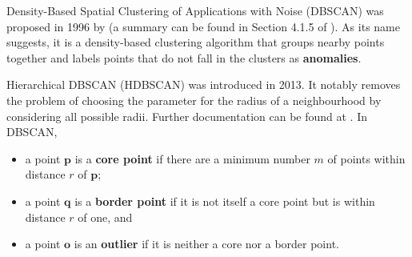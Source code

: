 \documentclass[20pt,landscape,footrule,headrule]{foils}
\newcommand{\newl}{\newline\newline}
\def\fh{\foilhead}
\begin{document}
\fh{DBSCAN}
Density-Based Spatial Clustering of Applications with Noise (DBSCAN) was proposed in 1996 by \cite{DBSCAN} 
(a summary can be found in Section 4.1.5 of \cite{A10}). 
As its name suggests, it is a density-based clustering algorithm that groups nearby points together and labels points that do not fall in the clusters as \textbf{anomalies}.

Hierarchical DBSCAN (HDBSCAN) \cite{HDBSCAN} was introduced in 2013.
It notably removes the problem of choosing the parameter for the radius of a neighbourhood by considering all possible radii. 
Further documentation can be found at \cite{HDBSCAN_code}. \newl 
In DBSCAN, 
\begin{itemize} 
\item a point $\mathbf{p}$ is a \textbf{core point} if there are a minimum number $m$ of points within distance $r$ of $\mathbf{p}$;
\item a point $\mathbf{q}$ is a \textbf{border point} if it is not itself a core point but is within distance $r$ of one, and 
\item a point $\mathbf{o}$ is an \textbf{outlier} if it is neither a core nor a border point.
\end{itemize}
\end{document}
